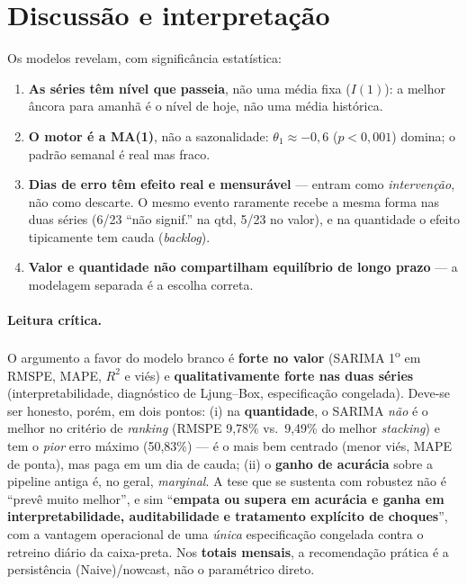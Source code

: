 \documentclass[11pt,a4paper]{article}
\begin{document}
\section{Discussão e interpretação}
\label{sec:disc}

Os modelos revelam, com significância estatística:
\begin{enumerate}\setlength\itemsep{2pt}
\item \textbf{As séries têm nível que passeia}, não uma média fixa ($I(1)$): a melhor âncora para
amanhã é o nível de hoje, não uma média histórica.
\item \textbf{O motor é a MA(1)}, não a sazonalidade: $\theta_1\approx-0{,}6$ ($p<0{,}001$) domina;
o padrão semanal é real mas fraco.
\item \textbf{Dias de erro têm efeito real e mensurável} --- entram como \emph{intervenção}, não
como descarte. O mesmo evento raramente recebe a mesma forma nas duas séries (6/23 ``não signif.''
na qtd, 5/23 no valor), e na quantidade o efeito tipicamente tem cauda (\emph{backlog}).
\item \textbf{Valor e quantidade não compartilham equilíbrio de longo prazo} --- a modelagem
separada é a escolha correta.
\end{enumerate}

\paragraph{Leitura crítica.} O argumento a favor do modelo branco é \textbf{forte no valor}
(SARIMA 1\textsuperscript{o} em RMSPE, MAPE, $R^2$ e viés) e \textbf{qualitativamente forte
nas duas séries} (interpretabilidade, diagnóstico de Ljung--Box, especificação congelada). Deve-se
ser honesto, porém, em dois pontos: (i) na \textbf{quantidade}, o SARIMA \emph{não} é o melhor no
critério de \emph{ranking} (RMSPE 9,78\% vs.\ 9,49\% do melhor \emph{stacking}) e tem o \emph{pior}
erro máximo
(50,83\%) --- é o mais bem centrado (menor viés, MAPE de ponta), mas paga em um dia de cauda; (ii) o
\textbf{ganho de acurácia} sobre a pipeline antiga é, no geral, \emph{marginal}. A tese que se
sustenta com robustez não é ``prevê muito melhor'', e sim ``\textbf{empata ou supera em acurácia e
ganha em interpretabilidade, auditabilidade e tratamento explícito de choques}'', com a vantagem
operacional de uma \emph{única} especificação congelada contra o retreino diário da caixa-preta.
Nos \textbf{totais mensais}, a recomendação prática é a persistência (Naive)/nowcast, não o
paramétrico direto.
\end{document}
